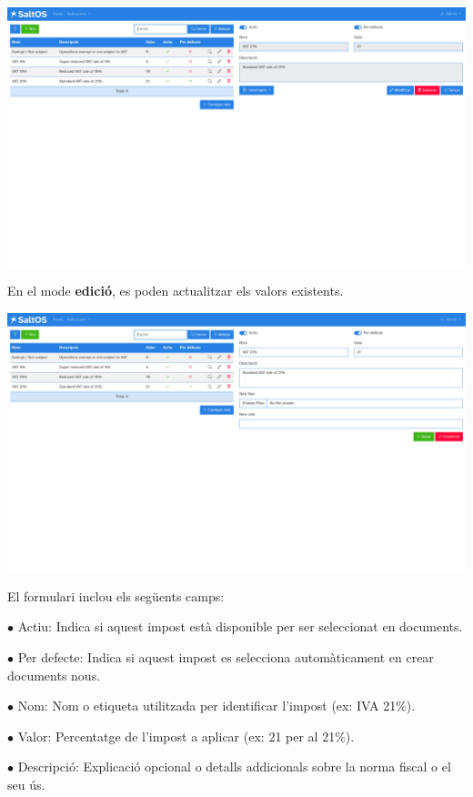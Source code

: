 \documentclass[a4paper]{article}
\begin{document}
\begin{center}\includegraphics[width=1\textwidth]{../ujest/snaps/test-screenshots-js-screenshots-sales-taxes-view-1-ca-es-1-snap.png}\end{center}

En el mode \textbf{edició}, es poden actualitzar els valors existents.

\begin{center}\includegraphics[width=1\textwidth]{../ujest/snaps/test-screenshots-js-screenshots-sales-taxes-edit-1-ca-es-1-snap.png}\end{center}

El formulari inclou els següents camps:

\begin{compactitem}
\item[\color{myblue}$\bullet$] Actiu: Indica si aquest impost està disponible per ser seleccionat en documents.
\item[\color{myblue}$\bullet$] Per defecte: Indica si aquest impost es selecciona automàticament en crear documents nous.
\item[\color{myblue}$\bullet$] Nom: Nom o etiqueta utilitzada per identificar l'impost (ex: IVA 21\%).
\item[\color{myblue}$\bullet$] Valor: Percentatge de l'impost a aplicar (ex: 21 per al 21\%).
\item[\color{myblue}$\bullet$] Descripció: Explicació opcional o detalls addicionals sobre la norma fiscal o el seu ús.
\end{compactitem}
\end{document}
